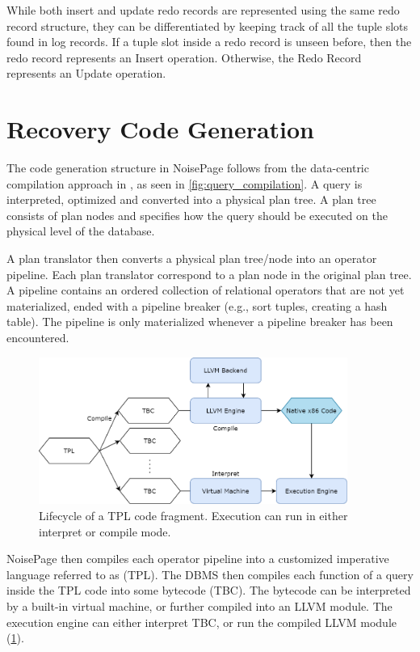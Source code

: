 \documentclass[12pt]{cmuthesis}
\begin{document}
While both insert and update redo records are represented using the same redo record structure, they can be differentiated by keeping track of all the tuple slots found in log records. If a tuple slot inside a redo record is unseen before, then the redo record represents an Insert operation. Otherwise, the Redo Record represents an Update operation.

\section{Recovery Code Generation}
The code generation structure in NoisePage follows from the data-centric compilation approach in \cite{neumann11}, as seen in \cref{fig:query_compilation}. A query is interpreted, optimized and converted into a physical plan tree. A plan tree consists of plan nodes and specifies how the query should be executed on the physical level of the database. 

A plan translator then converts a physical plan tree/node into an operator pipeline. Each plan translator correspond to a plan node in the original plan tree. A pipeline contains an ordered collection of relational operators that are not yet materialized, ended with a pipeline breaker (e.g., sort tuples, creating a hash table). The pipeline is only materialized whenever a pipeline breaker has been encountered.

\begin{figure}[t!]
\centering
\includegraphics[width=0.9\textwidth]{images/LLVM.png}
\caption{Lifecycle of a TPL code fragment. Execution can run in either interpret or compile mode.}
\label{fig:llvm}
\end{figure}
NoisePage then compiles each operator pipeline into a customized imperative language referred to as (TPL). The DBMS then compiles each function of a query inside the TPL code into some bytecode (TBC). The bytecode can be interpreted by a built-in virtual machine, or further compiled into an LLVM module. The execution engine can either interpret TBC, or run the compiled LLVM module (\cref{fig:llvm}).
\end{document}
